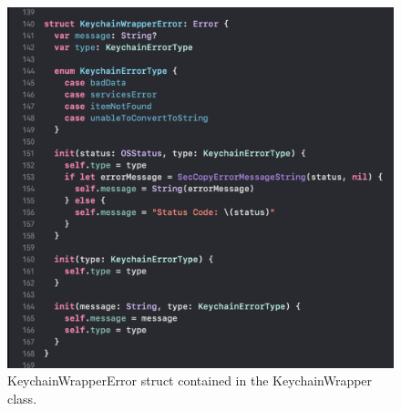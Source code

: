 \begin{figure}[H]
    \centering
    \includegraphics[width=\textwidth]{./graphics/Implementation/Settings/keychain5.png}
    \caption{KeychainWrapperError struct contained in the KeychainWrapper class.}
    \label{fig:keychain5}
\end{figure}